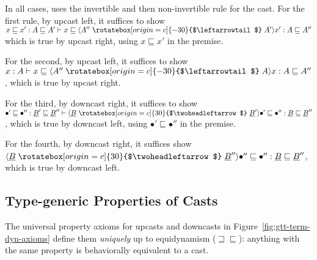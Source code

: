 \documentclass[acmsmall,nonacm]{acmart}
\renewcommand{\u}{\underline}
\newcommand{\ltdyn}{\sqsubseteq}
\newcommand{\gtdyn}{\sqsupseteq}
\newcommand{\equidyn}{\mathrel{\gtdyn\ltdyn}}
\newcommand{\uarrow}{\mathrel{\rotatebox[origin=c]{-30}{$\leftarrowtail$}}}
\newcommand{\darrow}{\mathrel{\rotatebox[origin=c]{30}{$\twoheadleftarrow$}}}
\newcommand{\upcast}[2]{\langle{#2}\uarrow{#1}\rangle}
\newcommand{\dncast}[2]{\langle{#1}\darrow{#2}\rangle}
\begin{document}
\begin{longonly}
\begin{lemma}
\begin{small}
\end{small}
\end{lemma}
\begin{longproof}
In all cases, uses the invertible and then non-invertible rule for the
cast.  For the first rule, by upcast left, it suffices to show $x \ltdyn
x' : A \ltdyn A' \vdash {x} \ltdyn \upcast{A'}{A''}{x'} : A \ltdyn A''$
which is true by upcast right, using $x \ltdyn x'$ in the premise.

For the second, by upcast left, it suffices to show 
$x : A \vdash {x} \ltdyn \upcast{A}{A''}{x} : A \ltdyn A''$,
which is true by upcast right.

For the third, by downcast right, it suffices to show 
$\bullet' \ltdyn \bullet'' : \u B' \ltdyn \u B'' \vdash \dncast{\u B}{\u B'}{\bullet'} \ltdyn {\bullet''} : \u B \ltdyn \u B''$,
which is true by downcast left, using $\bullet' \ltdyn \bullet''$ in the premise.

For the fourth, by downcast right, it suffices show
$\dncast{\u B}{\u B''}{\bullet''}\ltdyn {\bullet''} : \u B \ltdyn \u B''$,
which is true by downcast left.
\end{longproof}
\end{longonly}

\subsection{Type-generic Properties of Casts}

The universal property axioms for upcasts and downcasts in
Figure~\ref{fig:gtt-term-dyn-axioms} define them \emph{uniquely} up to
equidynamism ($\equidyn$): anything with the same property 
is behaviorally equivalent to a cast.
\end{document}

